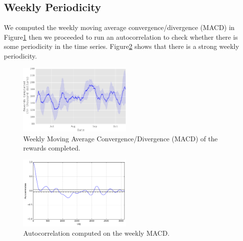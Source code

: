 \subsection{Weekly Periodicity}
We computed the weekly moving average convergence/divergence (MACD) in Figure\ref{fig:mac} then we proceeded to run an autocorrelation to check whether there is some periodicity in the time series. Figure\ref{fig:autocorrelation2} shows that there is a strong weekly periodicity.
\begin{figure}[htbp]
	\centering
		\includegraphics[width=0.5\textwidth]{figures/mac}
	\caption{Weekly Moving Average Convergence/Divergence (MACD) of the rewards completed.}
	\label{fig:mac}
\end{figure}
\begin{figure}[htbp]
	\centering
		\includegraphics[width=0.5\textwidth]{figures/autocorrelation2}
	\caption{Autocorrelation computed on the weekly MACD.}
	\label{fig:autocorrelation2}
\end{figure}